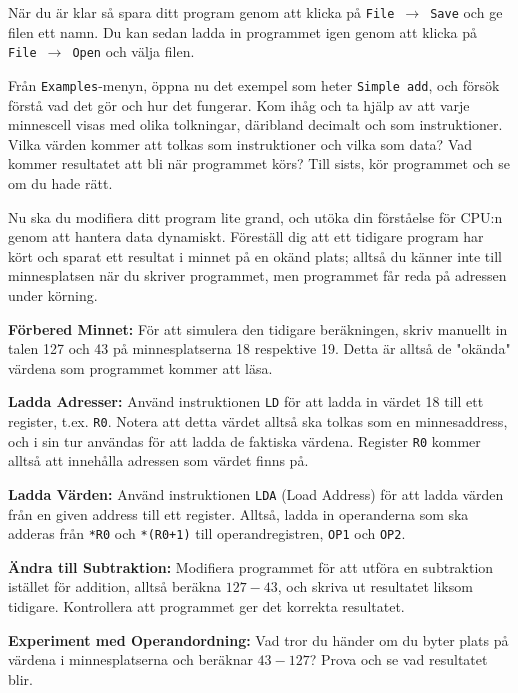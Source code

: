 \begin{Datorarbete}
    När du är klar så spara ditt program genom att klicka på \texttt{File}~$\rightarrow$~\texttt{Save} och ge filen ett namn. Du kan sedan ladda in programmet igen genom att klicka på \texttt{File}~$\rightarrow$~\texttt{Open} och välja filen.
    \vspace{-2mm}

    \item {} Från \texttt{Examples}-menyn, öppna nu det exempel som heter \texttt{Simple~add}, och försök förstå vad det gör och hur det fungerar. Kom ihåg och ta hjälp av att varje minnescell visas med olika tolkningar, däribland decimalt och som instruktioner. Vilka värden kommer att tolkas som instruktioner och vilka som data? Vad kommer resultatet att bli när programmet körs? Till sists, kör programmet och se om du hade rätt.
    
    \newpage

    \item {} Nu ska du modifiera ditt program lite grand, och utöka din förståelse för CPU:n genom att hantera data dynamiskt. Föreställ dig att ett tidigare program har kört och sparat ett resultat i minnet på en okänd plats; alltså du känner inte till minnesplatsen när du skriver programmet, men programmet får reda på adressen under körning.

    \begin{Deluppgifter}
        \item \textbf{Förbered Minnet:} För att simulera den tidigare beräkningen, skriv manuellt in talen 127 och 43 på minnesplatserna 18 respektive 19. Detta är alltså de "okända" värdena som programmet kommer att läsa.
        \item \textbf{Ladda Adresser:} Använd instruktionen \texttt{LD} för att ladda in värdet 18 till ett register, t.ex. \texttt{R0}. Notera att detta värdet alltså ska tolkas som en minnesaddress, och i sin tur användas för att ladda de faktiska värdena. Register \texttt{R0} kommer alltså att innehålla adressen som värdet finns på.
        \item \textbf{Ladda Värden:} Använd instruktionen \texttt{LDA} (Load Address) för att ladda värden från en given address till ett register. Alltså, ladda in operanderna som ska adderas från \texttt{*R0} och \texttt{*(R0+1)} till operandregistren, \texttt{OP1} och \texttt{OP2}.
        \item \textbf{Ändra till Subtraktion:} Modifiera programmet för att utföra en subtraktion istället för addition, alltså beräkna \(127-43\), och skriva ut resultatet liksom tidigare. Kontrollera att programmet ger det korrekta resultatet.
        \item \textbf{Experiment med Operandordning:} Vad tror du händer om du byter plats på värdena i minnesplatserna och beräknar \(43-127\)? Prova och se vad resultatet blir.
    \end{Deluppgifter}


\end{Datorarbete}
